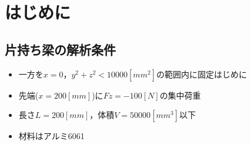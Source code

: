 \section{はじめに}
  \subsection{片持ち梁の解析条件}
    \begin{itemize}
      \item 一方を$x=0$，$y^2+z^2<10000[mm^2]$の範囲内に固定はじめに
      \item 先端($x=200[mm]$)に$Fz=-100[N]$の集中荷重
      \item 長さ$L=200[mm]$，体積$V=50000[mm^3]$以下
      \item 材料はアルミ6061
    \end{itemize}
